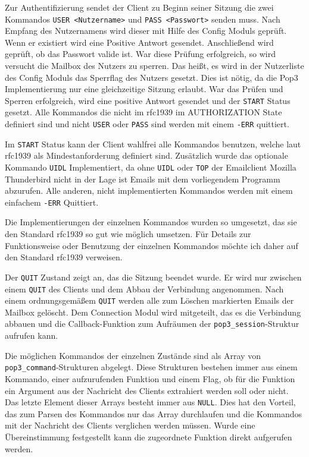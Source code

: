 \documentclass[final,a4paper,11pt,notitlepage,halfparskip]{scrreprt}
\begin{document}
Zur Authentifizierung sendet der Client zu Beginn seiner Sitzung die zwei 
Kommandos \texttt{USER <Nutzername>} und \texttt{PASS <Passwort>} senden muss.
Nach Empfang des Nutzernamens wird dieser mit Hilfe des Config Moduls geprüft. 
Wenn er existiert wird eine Positive Antwort gesendet. Anschließend wird 
geprüft, ob das Passwort valide ist. War diese Prüfung erfolgreich, so wird 
versucht die Mailbox des Nutzers zu sperren. Das heißt, es wird in der 
Nutzerliste des Config Moduls das Sperrflag des Nutzers gesetzt. Dies ist 
nötig, da die Pop3 Implementierung nur eine gleichzeitige Sitzung erlaubt. 
War das Prüfen und Sperren erfolgreich, wird eine positive Antwort gesendet und
der \texttt{START} Status gesetzt.
Alle Kommandos die nicht im rfc1939 im AUTHORIZATION State definiert sind und
nicht \texttt{USER} oder \texttt{PASS} sind werden mit einem \texttt{-ERR}
quittiert.

Im \texttt{START} Status kann der Client wahlfrei alle Kommandos benutzen,
welche laut rfc1939 als Mindestanforderung definiert sind. Zusätzlich wurde das
optionale Kommando \texttt{UIDL} Implementiert, da ohne \texttt{UIDL} oder
\texttt{TOP} der Emailclient Mozilla Thunderbird nicht in der Lage ist Emails
mit dem vorliegendem Programm abzurufen. Alle anderen, nicht implementierten
Kommandos werden mit einem einfachem \texttt{-ERR} Quittiert. 

Die Implementierungen der einzelnen Kommandos wurden so umgesetzt, das sie den
Standard rfc1939 so gut wie möglich umsetzen. Für Details zur Funktionsweise
oder Benutzung der einzelnen Kommandos möchte ich daher auf den Standard 
rfc1939 verweisen.

Der \texttt{QUIT} Zustand zeigt an, das die Sitzung beendet wurde. Er wird nur
zwischen einem \texttt{QUIT} des Clients und dem Abbau der Verbindung
angenommen. Nach einem ordnungsgemäßem \texttt{QUIT} werden alle zum Löschen
markierten Emails der Mailbox gelöscht. Dem Connection Modul wird mitgeteilt,
das es die Verbindung abbauen und die Callback-Funktion zum Aufräumen der
\texttt{pop3\_session}-Struktur aufrufen kann.

Die möglichen Kommandos der einzelnen Zustände sind als Array von
\texttt{pop3\_command}-Strukturen abgelegt. Diese Strukturen bestehen immer aus
einem Kommando, einer aufzurufenden Funktion und einem Flag, ob für die Funktion
ein Argument aus der Nachricht des Clients extrahiert werden soll oder nicht.
Das letzte Element dieser Arrays besteht immer aus \texttt{NULL}. Dies hat den 
Vorteil, das zum Parsen des Kommandos nur das Array durchlaufen und die 
Kommandos mit der Nachricht des Clients verglichen werden müssen. Wurde eine
Übereinstimmung festgestellt kann die zugeordnete Funktion direkt aufgerufen
werden.
\end{document}
